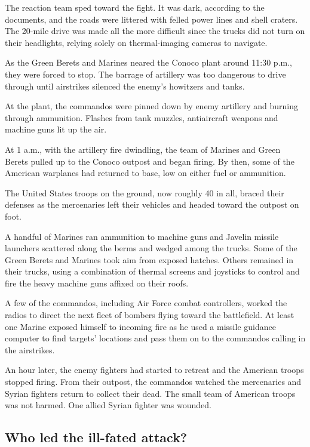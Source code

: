 The reaction team sped toward the fight. It was dark, according to the
documents, and the roads were littered with felled power lines and shell
craters. The 20-mile drive was made all the more difficult since the
trucks did not turn on their headlights, relying solely on
thermal-imaging cameras to navigate.

As the Green Berets and Marines neared the Conoco plant around 11:30
p.m., they were forced to stop. The barrage of artillery was too
dangerous to drive through until airstrikes silenced the enemy's
howitzers and tanks.

At the plant, the commandos were pinned down by enemy artillery and
burning through ammunition. Flashes from tank muzzles, antiaircraft
weapons and machine guns lit up the air.

At 1 a.m., with the artillery fire dwindling, the team of Marines and
Green Berets pulled up to the Conoco outpost and began firing. By then,
some of the American warplanes had returned to base, low on either fuel
or ammunition.

The United States troops on the ground, now roughly 40 in all, braced
their defenses as the mercenaries left their vehicles and headed toward
the outpost on foot.

A handful of Marines ran ammunition to machine guns and Javelin missile
launchers scattered along the berms and wedged among the trucks. Some of
the Green Berets and Marines took aim from exposed hatches. Others
remained in their trucks, using a combination of thermal screens and
joysticks to control and fire the heavy machine guns affixed on their
roofs.

A few of the commandos, including Air Force combat controllers, worked
the radios to direct the next fleet of bombers flying toward the
battlefield. At least one Marine exposed himself to incoming fire as he
used a missile guidance computer to find targets' locations and pass
them on to the commandos calling in the airstrikes.

An hour later, the enemy fighters had started to retreat and the
American troops stopped firing. From their outpost, the commandos
watched the mercenaries and Syrian fighters return to collect their
dead. The small team of American troops was not harmed. One allied
Syrian fighter was wounded.

\hypertarget{who-led-the-ill-fated-attack}{%
\subsection{Who led the ill-fated
attack?}\label{who-led-the-ill-fated-attack}}

